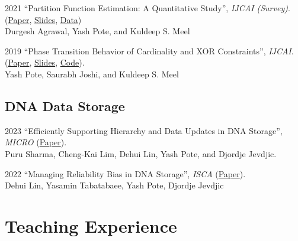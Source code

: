\documentclass[12pt,letterpaper]{report}
\begin{document}
\begin{tablist}
	
	\item[2021] \tab  \enquote{Partition Function Estimation: A Quantitative Study},  \textit{IJCAI (Survey)}.\\
(\href{https://arxiv.org/abs/2105.11132}{Paper}, \href{https://meelgroup.github.io/publication/ijcai21_partition}{Slides}, \href{https://doi.org/10.5281/zenodo.4769117}{Data})\\
Durgesh Agrawal, Yash Pote, and Kuldeep S. Meel

		\item[2019] \tab \enquote{Phase Transition Behavior of Cardinality and
	XOR Constraints}, \textit{IJCAI}.\\ (\href{https://arxiv.org/abs/1910.09755}{Paper},  \href{https://meelgroup.github.io/files/slides/ijcai19pjm.pdf}{Slides},  \href{https://github.com/meelgroup/1-CARD-XOR/}{Code}).\\
Yash Pote, Saurabh Joshi, and Kuldeep S. Meel

\end{tablist}
	\subsection*{DNA Data Storage}
	\begin{tablist}
	
		\item[2023] \tab  \enquote{Efficiently Supporting Hierarchy and Data Updates in DNA Storage}, \textit{MICRO} (\href{https://arxiv.org/abs/2212.13447}{Paper}).\\
	Puru Sharma, Cheng-Kai Lim, Dehui Lin, Yash Pote, and Djordje Jevdjic.
	
		\item[2022] \tab  \enquote{Managing Reliability Bias in DNA Storage}, \textit{ISCA}  (\href{https://arxiv.org/abs/2204.12261}{Paper}).\\
	Dehui Lin, Yasamin Tabatabaee, Yash Pote, Djordje Jevdjic
	
\end{tablist}
	
	\section*{Teaching Experience}
	
\end{document}
